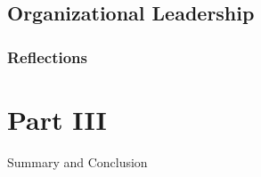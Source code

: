 \documentclass[12pt,titlepage]{article}
\begin{document}
\subsection{Organizational Leadership}
\subsubsection{Reflections}






\section{Part III}{Summary and Conclusion}



\end{document}
